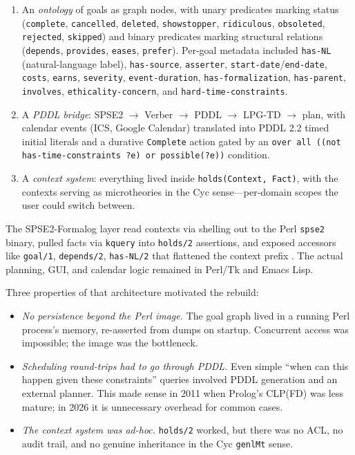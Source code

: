 \documentclass[11pt,letterpaper]{article}
\begin{document}
\begin{enumerate}
\item An \emph{ontology} of goals as graph nodes, with unary predicates
  marking status (\texttt{complete}, \texttt{cancelled}, \texttt{deleted},
  \texttt{showstopper}, \texttt{ridiculous}, \texttt{obsoleted},
  \texttt{rejected}, \texttt{skipped}) and binary predicates marking
  structural relations (\texttt{depends}, \texttt{provides}, \texttt{eases},
  \texttt{prefer}). Per-goal metadata included \texttt{has-NL}
  (natural-language label), \texttt{has-source}, \texttt{asserter},
  \texttt{start-date}/\texttt{end-date}, \texttt{costs}, \texttt{earns},
  \texttt{severity}, \texttt{event-duration}, \texttt{has-formalization},
  \texttt{has-parent}, \texttt{involves}, \texttt{ethicality-concern}, and
  \texttt{hard-time-constraints}.

\item A \emph{PDDL bridge}: SPSE2 $\to$ Verber $\to$ PDDL $\to$ LPG-TD $\to$
  plan, with calendar events (ICS, Google Calendar) translated into PDDL
  2.2 timed initial literals and a durative \texttt{Complete} action gated
  by an \texttt{over all ((not has-time-constraints ?e) or possible(?e))}
  condition.

\item A \emph{context system}: everything lived inside
  \texttt{holds(Context, Fact)}, with the contexts serving as microtheories
  in the Cyc sense---per-domain scopes the user could switch between.
\end{enumerate}

The SPSE2-Formalog layer read contexts via shelling out to the Perl
\texttt{spse2} binary, pulled facts via \texttt{kquery} into
\texttt{holds/2} assertions, and exposed accessors like \texttt{goal/1},
\texttt{depends/2}, \texttt{has-NL/2} that flattened the context prefix \citep{guha-lenat-cyc-1990}.
The actual planning, GUI, and calendar logic remained in Perl/Tk and Emacs
Lisp.

Three properties of that architecture motivated the rebuild:

\begin{itemize}
\item \emph{No persistence beyond the Perl image.} The goal graph lived in
  a running Perl process's memory, re-asserted from dumps on startup.
  Concurrent access was impossible; the image was the bottleneck.
\item \emph{Scheduling round-trips had to go through PDDL.} Even simple
  ``when can this happen given these constraints'' queries involved PDDL
  generation and an external planner. This made sense in 2011 when
  Prolog's CLP(FD) was less mature; in 2026 it is unnecessary overhead for
  common cases.
\item \emph{The context system was ad-hoc.} \texttt{holds/2} worked, but
  there was no ACL, no audit trail, and no genuine inheritance in the Cyc
  \texttt{genlMt} sense.
\end{itemize}
\end{document}
